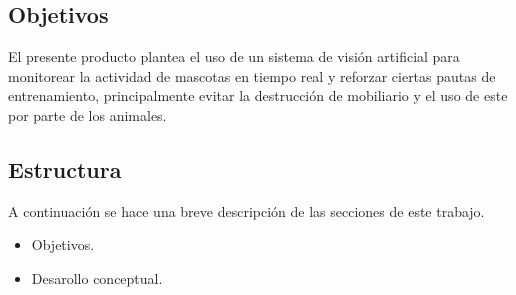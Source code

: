 \subsection{Objetivos}

El presente producto plantea el uso de un sistema de visión artificial para monitorear la actividad de mascotas en tiempo real y reforzar ciertas pautas de entrenamiento, principalmente evitar la destrucción de mobiliario y el uso de este por parte de los animales. 

\subsection{Estructura}

A continuación se hace una breve descripción de las secciones de este trabajo.

\begin{itemize}
  \item Objetivos.
  \item Desarollo conceptual.
\end{itemize}